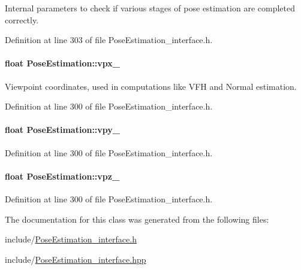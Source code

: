 Internal parameters to check if various stages of pose estimation are completed correctly. 



Definition at line 303 of file Pose\-Estimation\-\_\-interface.\-h.

\hypertarget{classPoseEstimation_ab9e6a36597bef9a8f3a831423bdae1c9}{
\paragraph[{vpx\-\_\-}]{\setlength{\rightskip}{0pt plus 5cm}float Pose\-Estimation\-::vpx\-\_\-\hspace{0.3cm}{\ttfamily [private]}}}\label{classPoseEstimation_ab9e6a36597bef9a8f3a831423bdae1c9}


Viewpoint coordinates, used in computations like V\-F\-H and Normal estimation. 



Definition at line 300 of file Pose\-Estimation\-\_\-interface.\-h.

\hypertarget{classPoseEstimation_a1511fe49165c547efae9bed1b2353d07}{
\paragraph[{vpy\-\_\-}]{\setlength{\rightskip}{0pt plus 5cm}float Pose\-Estimation\-::vpy\-\_\-\hspace{0.3cm}{\ttfamily [private]}}}\label{classPoseEstimation_a1511fe49165c547efae9bed1b2353d07}


Definition at line 300 of file Pose\-Estimation\-\_\-interface.\-h.

\hypertarget{classPoseEstimation_a49696bc81ba72d1b0e985aa8318b0a82}{
\paragraph[{vpz\-\_\-}]{\setlength{\rightskip}{0pt plus 5cm}float Pose\-Estimation\-::vpz\-\_\-\hspace{0.3cm}{\ttfamily [private]}}}\label{classPoseEstimation_a49696bc81ba72d1b0e985aa8318b0a82}


Definition at line 300 of file Pose\-Estimation\-\_\-interface.\-h.



The documentation for this class was generated from the following files\-:\begin{DoxyCompactItemize}
\item 
include/\hyperlink{PoseEstimation__interface_8h}{Pose\-Estimation\-\_\-interface.\-h}\item 
include/\hyperlink{PoseEstimation__interface_8hpp}{Pose\-Estimation\-\_\-interface.\-hpp}\end{DoxyCompactItemize}
